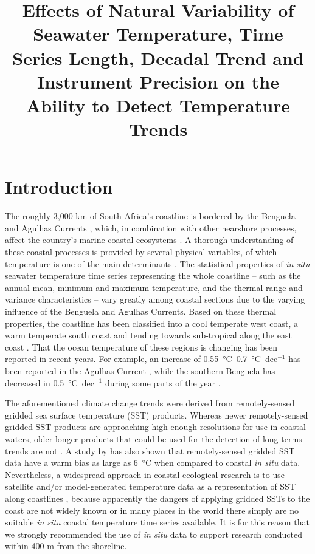 \documentclass[]{ametsoc}
\title{Effects of Natural Variability of Seawater Temperature, Time Series Length, Decadal Trend and Instrument Precision on the Ability to Detect Temperature Trends}
\affiliation{Department of Biodiversity and Conservation Biology, University of the Western Cape, Bellville, Republic of South Africa}
\begin{document}
\maketitle

\section{Introduction}
The roughly 3,000 km of South Africa's coastline is bordered by the Benguela and Agulhas Currents \citep[\emph{e.g.}][]{Roberts2005,Hutchings2009}, which, in combination with other nearshore processes, affect the country's marine coastal ecosystems \citep{Santos2012a}. A thorough understanding of these coastal processes is provided by several physical variables, of which temperature is one of the main determinants \citep[\emph{e.g.}][]{Blanchette2008, Tittensor2010, Couce2012}. The statistical properties of \emph{in situ} seawater temperature time series representing the whole coastline -- such as the annual mean, minimum and maximum temperature, and the thermal range and variance characteristics -- vary greatly among coastal sections due to the varying influence of the Benguela and Agulhas Currents. Based on these thermal properties, the coastline has been classified into a cool temperate west coast, a warm temperate south coast and tending towards sub-tropical along the east coast \citep{Smit2013,Mead2013}. That the ocean temperature of these regions is changing has been reported in recent years. For example, an increase of \SIrange{0.55}{0.7}{\degreeCelsius}~dec$^{-1}$ has been reported in the Agulhas Current \citep{Rouault2009,Rouault2010}, while the southern Benguela has decreased in \SI{0.5}{\degreeCelsius}~dec$^{-1}$ during some parts of the year \citep{Rouault2010}.

The aforementioned climate change trends were derived from remotely-sensed gridded sea surface temperature (SST) products. Whereas newer remotely-sensed gridded SST products are approaching high enough resolutions for use in coastal waters, older longer products that could be used for the detection of long terms trends are not \citep[\emph{e.g.}][]{Chao2009, Qiu2009, Vazquez-Cuervo2013}. A study by \citet{Smit2013} has also shown that remotely-sensed gridded SST data have a warm bias as large as \SI{6}{\degreeCelsius} when compared to coastal \emph{in situ} data. Nevertheless, a widespread approach in coastal ecological research is to use satellite and/or model-generated temperature data as a representation of SST along coastlines \citep[\emph{e.g.}][]{Blanchette2008, Broitman2008a, Tyberghein2012}, because apparently the dangers of applying gridded SSTs to the coast are not widely known or in many places in the world there simply are no suitable \emph{in situ} coastal temperature time series available. It is for this reason that we strongly recommended the use of \emph{in situ} data to support research conducted within 400 m from the shoreline.
\end{document}
